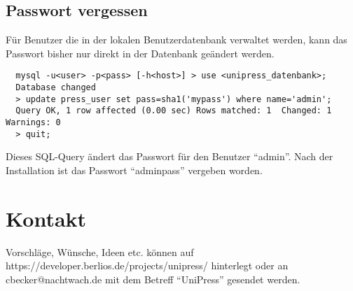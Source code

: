 \documentclass[a4paper,10pt,twoside]{article}
\begin{document}
 \subsection{Passwort vergessen}
  Für Benutzer die in der lokalen Benutzerdatenbank verwaltet werden, kann das 
  Passwort bisher nur direkt in der Datenbank geändert werden.\\
  {\tiny
	\begin{lstlisting}
  mysql -u<user> -p<pass> [-h<host>] > use <unipress_datenbank>; 
  Database changed 
  > update press_user set pass=sha1('mypass') where name='admin'; 
  Query OK, 1 row affected (0.00 sec) Rows matched: 1  Changed: 1  Warnings: 0 
  > quit;
	\end{lstlisting}
  } Dieses SQL-Query ändert das Passwort für den Benutzer ``admin''. Nach der 
  Installation ist das Passwort ``adminpass'' vergeben worden.
%
%
%
\section{Kontakt}
 Vorschläge, Wünsche, Ideen etc. können auf
 \textsf{https://developer.berlios.de/projects/unipress/} hinterlegt oder 
  an cbecker@nachtwach.de mit dem Betreff ``UniPress'' gesendet werden.
 
\end{document}
